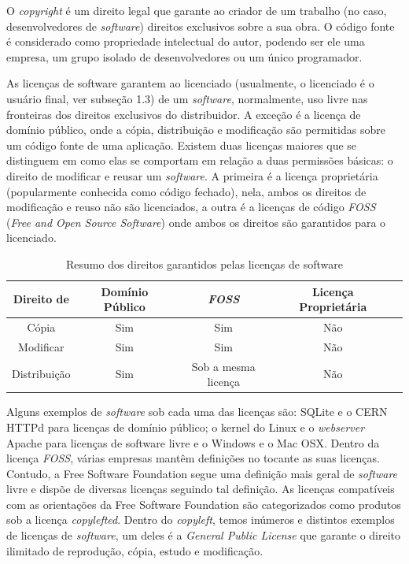\documentclass{classe_cn}                 %
\begin{document}
O \textit{copyright} é um direito legal que garante ao criador de um trabalho (no caso, desenvolvedores de \textit{software}) direitos exclusivos sobre a sua obra. O código fonte é considerado como propriedade intelectual do autor, podendo ser ele uma empresa, um grupo isolado de desenvolvedores ou um único programador.

As licenças de software garantem ao licenciado (usualmente, o licenciado é o usuário final, ver subseção 1.3) de um \textit{software}, normalmente, uso livre nas fronteiras dos direitos exclusivos do distribuidor. A exceção é a licença de domínio público, onde a cópia, distribuição e modificação são permitidas sobre um código fonte de uma aplicação.
Existem duas licenças maiores que se distinguem em como elas se comportam em relação a duas permissões básicas: o direito de modificar e reusar um \textit{software}. A primeira é a licença proprietária (popularmente conhecida como código fechado), nela, ambos os direitos de modificação e reuso não são licenciados, a outra é a licenças de código \textit{FOSS} (\textit{Free and Open Source Software}) onde ambos os direitos são garantidos para o licenciado.

\begin{table}[h!]
\label{tag_tabela_2}
\caption{Resumo dos direitos garantidos pelas licenças de software}
	\begin{tabular}{ccccc}
	\hline
	Direito de		&	Domínio Público	&	\textit{FOSS}	&	Licença Proprietária \\ \hline
	Cópia	&	Sim	&	Sim	&	Não							\\
	Modificar	&	Sim	&	Sim	&	Não						\\
	Distribuição	&	Sim	&	Sob a mesma licença	&	Não\\ \hline
	\end{tabular}
	\end{table}
	
Alguns exemplos de \textit{software} sob cada uma das licenças são: SQLite e o CERN HTTPd para licenças de domínio público; o kernel do Linux e o \textit{webserver} Apache para licenças de software livre e o Windows e o Mac OSX.
Dentro da licença \textit{FOSS}, várias empresas mantêm definições no tocante as suas licenças. Contudo, a Free Software Foundation segue uma definição mais geral de \textit{software} livre e dispõe de diversas licenças seguindo tal definição. As licenças compatíveis com as orientações da Free Software Foundation são categorizados como produtos sob a licença \textit{copylefted}. Dentro do \textit{copyleft}, temos inúmeros e distintos exemplos de licenças de \textit{software}, um deles é a \textit{General Public License} que garante o direito ilimitado de reprodução, cópia, estudo e modificação. 
\end{document}

